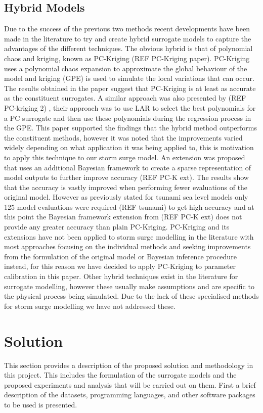 \documentclass[12pt,a4paper]{article}
\begin{document}
\subsection{Hybrid Models}
\noindent
Due to the success of the previous two methods recent developments have been made in the literature to try and create hybrid surrogate models to capture the advantages of the different techniques. The obvious hybrid is that of polynomial chaos and kriging, known as PC-Kriging (REF PC-Kriging paper). PC-Kriging uses a polynomial chaos expansion to approximate the global behaviour of the model and kriging (GPE) is used to simulate the local variations that can occur. The results obtained in the paper suggest that PC-Kriging is at least as accurate as the constituent surrogates. A similar approach was also presented by (REF PC-kriging 2) , their approach was to use LAR to select the best polynomials for a PC surrogate and then use these polynomials during the regression process in the GPE. This paper supported the findings that the hybrid method outperforms the constituent methods, however it was noted that the improvements varied widely depending on what application it was being applied to, this is motivation to apply this technique to our storm surge model. An extension was proposed that uses an additional Bayesian framework to create a sparse representation of model outputs to further improve accuracy (REF PC-K ext). The results show that the accuracy is vastly improved when performing fewer evaluations of the original model. However as previously stated for tsunami sea level models only 125 model evaluations were required (REF tsunami) to get high accuracy and at this point the Bayesian framework extension from (REF PC-K ext) does not provide any greater accuracy than plain PC-Kriging. PC-Kriging and its extensions have not been applied to storm surge modelling in the literature with most approaches focusing on the individual methods and seeking improvements from the formulation of the original model or Bayesian inference procedure instead, for this reason we have decided to apply PC-Kriging to parameter calibration in this paper. Other hybrid techniques exist in the literature for surrogate modelling, however these usually make assumptions and are specific to the physical process being simulated. Due to the lack of these specialised methods for storm surge modelling we have not addressed these.

\section{Solution} \label{sec:sol}
\noindent
This section provides a description of the proposed solution and methodology in this project. This includes the formulation of the surrogate models and the proposed experiments and analysis that will be carried out on them. First a brief description of the datasets, programming languages, and other software packages to be used is presented.
\end{document}
